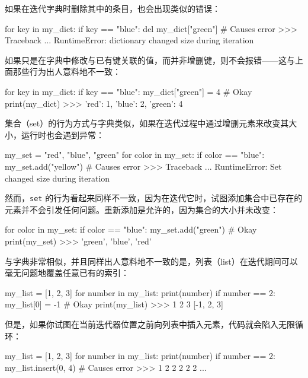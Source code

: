 如果在迭代字典时删除其中的条目，也会出现类似的错误：

\begin{codebox}[python]
for key in my_dict:
    if key == "blue":
        del my_dict["green"]  # Causes error
>>>
Traceback ...
RuntimeError: dictionary changed size during iteration
\end{codebox}

如果只是在字典中修改与已有键关联的值，而并非增删键，则不会报错——这与上面那些行为出人意料地不一致：

\begin{codebox}[python]
for key in my_dict:
    if key == "blue":
        my_dict["green"] = 4  # Okay
print(my_dict)
>>>
{'red': 1, 'blue': 2, 'green': 4}
\end{codebox}

集合（set）的行为方式与字典类似，如果在迭代过程中通过增删元素来改变其大小，运行时也会遇到异常：

\begin{codebox}[python]
my_set = {"red", "blue", "green"}
for color in my_set:
    if color == "blue":
        my_set.add("yellow")  # Causes error
>>>
Traceback ...
RuntimeError: Set changed size during iteration
\end{codebox}

然而，\texttt{set} 的行为看起来同样不一致，因为在迭代它时，试图添加集合中已存在的元素并不会引发任何问题。重新添加是允许的，因为集合的大小并未改变：

\begin{codebox}[python]
for color in my_set:
    if color == "blue":
        my_set.add("green")  # Okay
print(my_set)
>>>
{'green', 'blue', 'red'}
\end{codebox}

与字典非常相似，并且同样出人意料地不一致的是，列表（list）在迭代期间可以毫无问题地覆盖任意已有的索引：

\begin{codebox}[python]
my_list = [1, 2, 3]
for number in my_list:
    print(number)
    if number == 2:
        my_list[0] = -1  # Okay
print(my_list)
>>>
1
2
3
[-1, 2, 3]
\end{codebox}

但是，如果你试图在当前迭代器位置之前向列表中插入元素，代码就会陷入无限循环：

\begin{codebox}[python]
my_list = [1, 2, 3]
for number in my_list:
    print(number)
    if number == 2:
        my_list.insert(0, 4)  # Causes error
>>>
1
2
2
2
2
2
...
\end{codebox}

